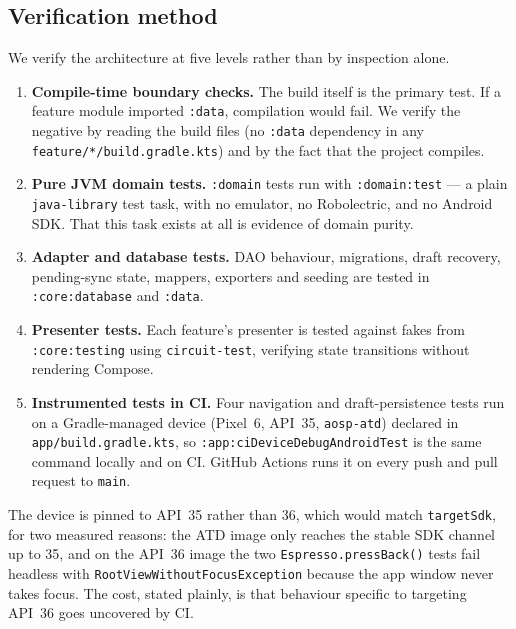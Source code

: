 \documentclass[11pt,a4paper]{article}
\newcommand{\mdl}[1]{\texttt{#1}}
\newcommand{\file}[1]{{\small\texttt{#1}}}
\begin{document}
\subsection{Verification method}

We verify the architecture at five levels rather than by inspection alone.

\begin{enumerate}[leftmargin=*]
  \item \textbf{Compile-time boundary checks.} The build itself is the primary
        test. If a feature module imported \mdl{:data}, compilation would fail.
        We verify the negative by reading the build files (no \texttt{:data}
        dependency in any \file{feature/*/build.gradle.kts}) and by the fact that
        the project compiles.
  \item \textbf{Pure JVM domain tests.} \mdl{:domain} tests run with
        \texttt{:domain:test} --- a plain \texttt{java-library} test task, with no
        emulator, no Robolectric, and no Android SDK. That this task exists at
        all is evidence of domain purity.
  \item \textbf{Adapter and database tests.} DAO behaviour, migrations, draft
        recovery, pending-sync state, mappers, exporters and seeding are tested
        in \mdl{:core:database} and \mdl{:data}.
  \item \textbf{Presenter tests.} Each feature's presenter is tested against
        fakes from \mdl{:core:testing} using \texttt{circuit-test}, verifying
        state transitions without rendering Compose.
  \item \textbf{Instrumented tests in CI.} Four navigation and
        draft-persistence tests run on a Gradle-managed device (Pixel~6,
        API~35, \texttt{aosp-atd}) declared in \file{app/build.gradle.kts}, so
        \texttt{:app:ciDeviceDebugAndroidTest} is the same command locally and
        on CI. GitHub Actions runs it on every push and pull request to
        \texttt{main}.
\end{enumerate}

The device is pinned to API~35 rather than 36, which would match
\texttt{targetSdk}, for two measured reasons: the ATD image only reaches the
stable SDK channel up to 35, and on the API~36 image the two
\texttt{Espresso.pressBack()} tests fail headless with
\texttt{RootViewWithoutFocusException} because the app window never takes focus.
The cost, stated plainly, is that behaviour specific to targeting API~36 goes
uncovered by CI.
\end{document}
